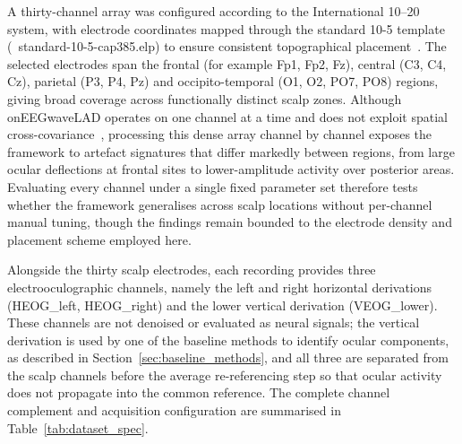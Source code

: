\documentclass[MScCS,12pt,oneside,final]{uccthesis}
\begin{document}
A thirty-channel array was configured according to the International 10--20 system, with electrode coordinates mapped through the standard 10-5 template (\ {standard-10-5-cap385.elp}) to ensure consistent topographical placement~\parencite{oostenveld2001five}. The selected electrodes span the frontal (for example Fp1, Fp2, Fz), central (C3, C4, Cz), parietal (P3, P4, Pz) and occipito-temporal (O1, O2, PO7, PO8) regions, giving broad coverage across functionally distinct scalp zones. Although onEEGwaveLAD operates on one channel at a time and does not exploit spatial cross-covariance~\parencite{longo2025oneegwavelad}, processing this dense array channel by channel exposes the framework to artefact signatures that differ markedly between regions, from large ocular deflections at frontal sites to lower-amplitude activity over posterior areas. Evaluating every channel under a single fixed parameter set therefore tests whether the framework generalises across scalp locations without per-channel manual tuning, though the findings remain bounded to the electrode density and placement scheme employed here.
    
Alongside the thirty scalp electrodes, each recording provides three electrooculographic channels, namely the left and right horizontal derivations (HEOG\_left, HEOG\_\allowbreak right) and the lower vertical derivation (VEOG\_lower). These channels are not denoised or evaluated as neural signals; the vertical derivation is used by one of the baseline methods to identify ocular components, as described in Section~\ref{sec:baseline_methods}, and all three are separated from the scalp channels before the average re-referencing step so that ocular activity does not propagate into the common reference. The complete channel complement and acquisition
configuration are summarised in Table~\ref{tab:dataset_spec}.
\end{document}
